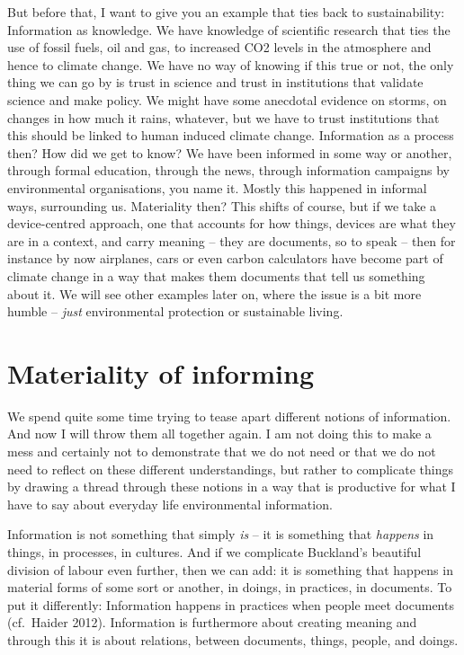 \documentclass[a4paper,
fontsize=11pt,
oneside,
numbers=noperiodatend,
parskip=half-,
bibliography=totoc,
final
]{scrartcl}
\begin{document}
But before that, I want to give you an example that ties back to
sustainability: Information as knowledge. We have knowledge of
scientific research that ties the use of fossil fuels, oil and gas, to
increased CO2 levels in the atmosphere and hence to climate change. We
have no way of knowing if this true or not, the only thing we can go by
is trust in science and trust in institutions that validate science and
make policy. We might have some anecdotal evidence on storms, on changes
in how much it rains, whatever, but we have to trust institutions that
this should be linked to human induced climate change. Information as a
process then? How did we get to know? We have been informed in some way
or another, through formal education, through the news, through
information campaigns by environmental organisations, you name it.
Mostly this happened in informal ways, surrounding us. Materiality then?
This shifts of course, but if we take a device-centred approach, one
that accounts for how things, devices are what they are in a context,
and carry meaning -- they are documents, so to speak -- then for
instance by now airplanes, cars or even carbon calculators have become
part of climate change in a way that makes them documents that tell us
something about it. We will see other examples later on, where the issue
is a bit more humble -- \emph{just} environmental protection or
sustainable living.

\section*{Materiality of informing}\label{materiality-of-informing}

We spend quite some time trying to tease apart different notions of
information. And now I will throw them all together again. I am not
doing this to make a mess and certainly not to demonstrate that we do
not need or that we do not need to reflect on these different
understandings, but rather to complicate things by drawing a thread
through these notions in a way that is productive for what I have to say
about everyday life environmental information.

Information is not something that simply \emph{is} -- it is something
that \emph{happens} in things, in processes, in cultures. And if we
complicate Buckland's beautiful division of labour even further, then we
can add: it is something that happens in material forms of some sort or
another, in doings, in practices, in documents. To put it differently:
Information happens in practices when people meet documents (cf.~Haider
2012). Information is furthermore about creating meaning and through
this it is about relations, between documents, things, people, and
doings.
\end{document}
